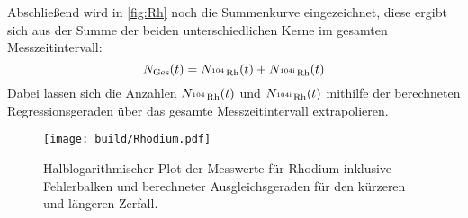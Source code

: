 Abschließend wird in \autoref{fig:Rh} noch die Summenkurve eingezeichnet, diese ergibt sich aus der
Summe der beiden unterschiedlichen Kerne im gesamten Messzeitintervall:
\begin{equation*}
N_{\text{Ges}}(t) = N_{\ce{^104 Rh}}(t) +  N_{\ce{^{104\text{i}} Rh}}(t)
\end{equation*}
Dabei lassen sich die Anzahlen $N_{\ce{^104 Rh}}(t)$ und $N_{\ce{^{104\text{i}} Rh}}(t)$ mithilfe der
berechneten Regressionsgeraden über das gesamte Messzeitintervall extrapolieren.

\begin{figure}[H]
    \centering
    \texttt{[image: build/Rhodium.pdf]}
    \caption{Halblogarithmischer Plot der Messwerte für Rhodium inklusive Fehlerbalken und berechneter Ausgleichsgeraden
    für den kürzeren und längeren Zerfall.}
    \label{fig:Rh}
\end{figure}